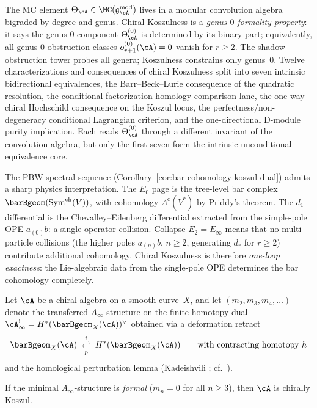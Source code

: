 The MC element $\Theta_\cA \in \MC(\mathfrak{g}_\cA^{\mathrm{mod}})$
lives in a modular convolution algebra bigraded by degree and genus.
Chiral Koszulness is a \emph{genus-$0$ formality property}:
it says the genus-$0$ component $\Theta_\cA^{(0)}$ is
determined by its binary part; equivalently, all genus-$0$
obstruction classes $o_{r+1}^{(0)}(\cA) = 0$ vanish for $r \geq 2$.
The shadow obstruction tower probes all genera; Koszulness constrains only
genus~$0$. Twelve characterizations and consequences of chiral
Koszulness split into seven intrinsic bidirectional equivalences,
the Barr--Beck--Lurie consequence of the quadratic resolution, the
conditional factorization-homology comparison lane, the one-way
chiral Hochschild consequence on the Koszul locus, the
perfectness/non-degeneracy conditional Lagrangian criterion, and the
one-directional D-module purity implication. Each reads
$\Theta_\cA^{(0)}$ through a different invariant of the
convolution algebra, but only the first seven form the intrinsic
unconditional equivalence core.

\begin{remark}
\label{rem:one-loop-exactness}

The PBW spectral sequence
(Corollary~\ref{cor:bar-cohomology-koszul-dual}) admits a sharp
physics interpretation. The $E_0$ page is the tree-level bar complex
$\barBgeom(\operatorname{Sym}^{\mathrm{ch}}(V))$, with cohomology
$\Lambda^{\mathrm{c}}(V^*)$ by Priddy's theorem. The $d_1$
differential is the Chevalley--Eilenberg differential extracted from
the simple-pole OPE $a_{(0)}b$: a single operator collision.
Collapse $E_2 = E_\infty$ means that no multi-particle collisions
(the higher poles $a_{(n)}b$, $n \geq 2$, generating $d_r$ for
$r \geq 2$) contribute additional cohomology. Chiral Koszulness is
therefore \emph{one-loop exactness}: the Lie-algebraic data from the
single-pole OPE determines the bar cohomology completely.
\end{remark}

\begin{proposition}
\label{prop:ainfty-formality-implies-koszul}

Let $\cA$ be a chiral algebra on a smooth curve~$X$, and let
$(m_2, m_3, m_4, \ldots)$ denote the transferred
$A_\infty$-structure on the finite homotopy dual
$\cA^!_\infty = H^*(\barBgeom_X(\cA))^\vee$
obtained via a deformation retract
\[
\barBgeom_X(\cA) \;\underset{p}{\overset{i}{\rightleftarrows}}\;
H^*(\barBgeom_X(\cA))
\qquad \text{with contracting homotopy } h
\]
and the homological perturbation lemma
\textup{(}Kadeishvili \cite{Kad82}; cf.\ \cite{LPWZ09}\textup{)}.

If the minimal $A_\infty$-structure is \emph{formal}
($m_n = 0$ for all $n \geq 3$), then $\cA$ is chirally Koszul.
\end{proposition}

